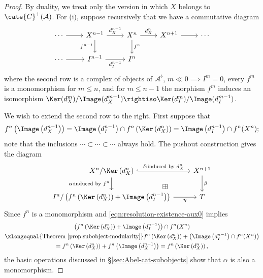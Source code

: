 \begin{proof}
	By duality, we treat only the version in which $X$ belongs to
	$\cate{C}^+(\mathcal{A})$. For (i), suppose recursively that we have a
	commutative diagram
	\[\begin{tikzcd}
		\cdots \arrow[r] & X^{n-1} \arrow[r, "{d_X^{n-1}}"] \arrow[d, "{f^{n-1}}"'] & X^n \arrow[r, "{d_X^n}"] \arrow[d, "{f^n}"] & X^{n+1} \arrow[r] & \cdots \\
		\cdots \arrow[r] & I^{n-1} \arrow[r, "{d_I^{n-1}}"'] & I^n & &
	\end{tikzcd}\]
	where the second row is a complex of objects of $\mathcal{A}^\flat$,
	$m\ll0\implies I^m=0$, every $f^m$ is a monomorphism for $m\leq n$, and
	for $m\leq n-1$ the morphism $f^m$ induces an isomorphism
	$\Ker(d_X^m)/\Image(d_X^{m-1})\rightiso
	\Ker(d_I^m)/\Image(d_I^{m-1})$.

	We wish to extend the second row to the right. First suppose that
	\begin{equation}\label{eqn:resolution-existence-aux0}
		f^n\left( \Image\left(d_X^{n-1} \right) \right) = \Image\left( d^{n-1}_I \right) \cap f^n\left( \Ker\left( d_X^n \right) \right) = \Image\left( d^{n-1}_I \right) \cap f^n(X^n) ;
	\end{equation}
	note that the inclusions $\cdots\subset\cdots\subset\cdots$ always hold.
	The pushout construction gives the diagram
	\begin{equation*}\begin{tikzcd}
		X^n / \Ker\left( d_X^n \right) \arrow[hookrightarrow, r, "\delta: \text{induced by $d_X^n$}"] \arrow[d, "\alpha: \text{induced by $f^n$}"'] & X^{n+1} \arrow[d, "\beta"] \\
		I^n / \left( f^n \left( \Ker\left( d_X^n \right) \right) + \Image\left( d_I^{n-1}\right) \right) \arrow[r, "\eta"'] & T \arrow[phantom, lu, "\boxplus" description]
	\end{tikzcd}\end{equation*}
	Since $f^n$ is a monomorphism and
	\eqref{eqn:resolution-existence-aux0} implies
	\begin{multline*}
		\left( f^n\left( \Ker\left( d_X^n \right) \right) + \Image\left( d_I^{n-1}\right) \right) \cap f^n(X^n) \\
		\xlongequal{\text{Theorem \ref{prop:subobject-modularity}}} f^n\left( \Ker\left( d_X^n \right) \right) + \left( \Image\left( d_I^{n-1}\right) \cap f^n(X^n) \right) \\
		= f^n\left( \Ker\left( d_X^n \right) \right) + f^n\left(\Image\left(d_X^{n-1} \right) \right) = f^n\left( \Ker\left( d_X^n \right) \right),
	\end{multline*}
	the basic operations discussed in \S\ref{sec:Abel-cat-subobjects} show that
	$\alpha$ is also a monomorphism.


\end{proof}
